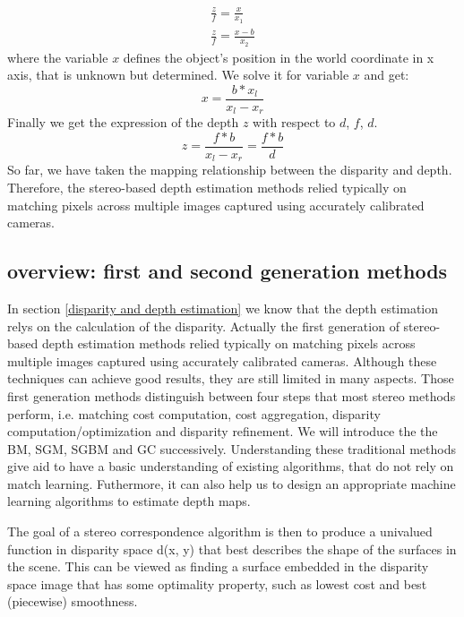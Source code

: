 \begin{gather}
\label{}
    \frac{z}{f} =  \frac{x}{x_1} \\
    \frac{z}{f} =  \frac{x-b}{x_2}
\end{gather}
where the variable $x$ defines the object's position in the world coordinate in x axis, that is unknown but determined. We solve it for variable $x$ and get: 
\begin{equation}
    x = \frac{b*x_l}{x_l-x_r}
\end{equation}
Finally we get the expression of the depth $z$ with respect to $d$, $f$, $d$.
\begin{equation}
    z = \frac{f*b}{x_l-x_r} = \frac{f*b}{d}
\end{equation}
So far, we have taken the mapping relationship between the disparity and depth. Therefore, the stereo-based depth estimation
methods relied typically on matching pixels across multiple images captured using accurately calibrated cameras. 

\subsection{overview: first and second generation methods}
\label{overview: first and second generation methods}
In section \ref{disparity and depth estimation} we know that the depth estimation relys on the calculation of the disparity. Actually the first generation of stereo-based depth estimation methods relied typically on matching pixels across multiple images captured using accurately calibrated cameras. Although these techniques can achieve good results, they are still limited in many aspects. Those first generation methods distinguish between four steps that most stereo methods perform, i.e. matching cost computation, cost aggregation, disparity computation/optimization and disparity
refinement\cite{scharstein2002taxonomy}. We will introduce the the BM, SGM, SGBM and GC successively. Understanding these traditional methods give aid to have a basic understanding of existing algorithms, that do not rely on match learning. Futhermore, it can also help us to design an appropriate machine learning algorithms to estimate depth maps. 

The goal of a stereo correspondence algorithm is then to produce a univalued function in disparity space d(x, y) that best describes the shape of the surfaces in the scene. This can be viewed as finding a surface embedded in the disparity space image that has some optimality property, such as lowest cost and best (piecewise) smoothness.

